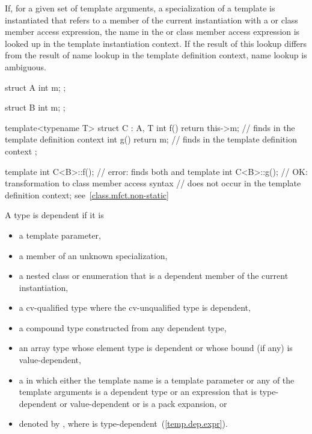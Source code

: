 \pnum
If, for a given set of template arguments, a specialization of a template is
instantiated that refers to a member of the current instantiation with a
 or class member access expression, the name in the
 or class member access expression is looked up in the
template instantiation context. If the result of this lookup differs from the
result of name lookup in the template definition context, name lookup is
ambiguous.
\enterexample
\begin{codeblock}
struct A {
  int m;
};

struct B {
  int m;
};

template<typename T>
struct C : A, T {
  int f() { return this->m; }  // finds  in the template definition context
  int g() { return m; }        // finds  in the template definition context
};

template int C<B>::f();        // error: finds both  and 
template int C<B>::g();        // OK: transformation to class member access syntax
                               // does not occur in the template definition context; see~\ref{class.mfct.non-static}
\end{codeblock}
\exitexample

\pnum
A type is dependent if it is
\begin{itemize}
\item
a template parameter,
\item
a member of an unknown specialization,
\item
a nested class or enumeration that is a dependent member of the current
instantiation,
\item
a cv-qualified type where the cv-unqualified type is dependent,
\item
a compound type constructed from any dependent type,
\item
an array type whose element type is dependent or whose
bound (if any) is value-dependent,
\item
a
in which either the template name is a template parameter or any of the
template arguments is a dependent type or an expression that is type-dependent
or value-dependent or is a pack expansion, or
\item denoted by \tcode{)},
where  is type-dependent~(\ref{temp.dep.expr}).
\end{itemize}

